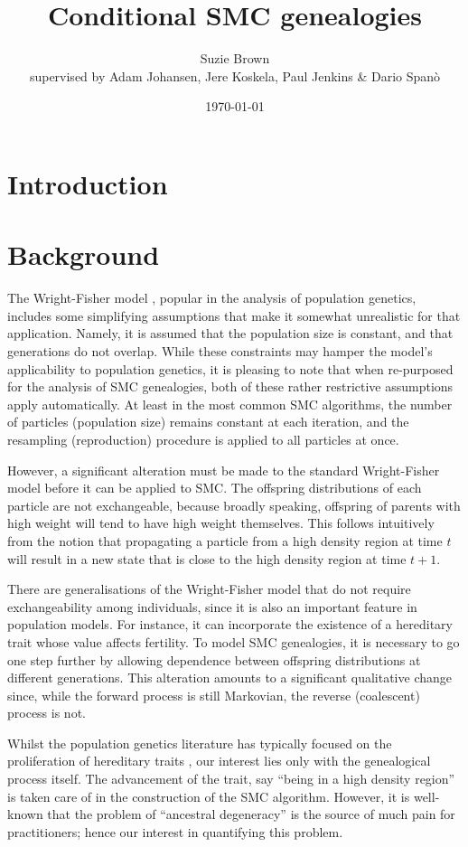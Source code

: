 \documentclass{article}
\title{Conditional SMC genealogies}
\author{Suzie Brown\\ {\small supervised by Adam Johansen, Jere Koskela, Paul Jenkins \& Dario Span\`o}}
\date{\today}
\begin{document}
\maketitle

\section{Introduction}

\section{Background}
The Wright-Fisher model \citep[Chapter 3]{wakeley2009}, popular in the analysis of population genetics, includes some simplifying assumptions that make it somewhat unrealistic for that application. Namely, it is assumed that the population size is constant, and that generations do not overlap. 
While these constraints may hamper the model's applicability to population genetics, it is pleasing to note that when re-purposed for the analysis of SMC genealogies, both of these rather restrictive assumptions apply automatically. At least in the most common SMC algorithms, the number of particles (population size) remains constant at each iteration, and the resampling (reproduction) procedure is applied to all particles at once.

However, a significant alteration must be made to the standard Wright-Fisher model before it can be applied to SMC. The offspring distributions of each particle are not exchangeable, because broadly speaking, offspring of parents with high weight will tend to have high weight themselves. This follows intuitively from the notion that propagating a particle from a high density region at time $t$ will result in a new state that is close to the high density region at time $t+1$.

There are generalisations of the Wright-Fisher model that do not require exchangeability among individuals, since it is also an important feature in population models. For instance, it can incorporate the existence of a hereditary trait whose value affects fertility. To model SMC genealogies, it is necessary to go one step further by allowing dependence between offspring distributions at different generations. This alteration amounts to a significant qualitative change since, while the forward process is still Markovian, the reverse (coalescent) process is not.

Whilst the population genetics literature has typically focused on the proliferation of hereditary traits \citep[Chapter 3]{wakeley2009}, our interest lies only with the genealogical process itself. The advancement of the trait, say ``being in a high density region'' is taken care of in the construction of the SMC algorithm. However, it is well-known that the problem of ``ancestral degeneracy'' is the source of much pain for practitioners; hence our interest in quantifying this problem.
\end{document}
